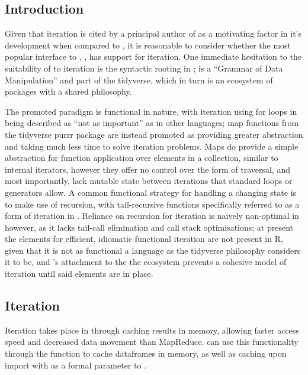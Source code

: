 \subsection{Introduction}\label{subsec:sparklyr-introduction}

Given that iteration is cited by a principal author of  as a
motivating factor in it's development when compared to , it is
reasonable to consider whether the most popular \R{} interface to ,
, has support for iteration\cites{zaharia2010spark,luraschi20}.
One immediate hesitation to the suitability of  to iteration is
the syntactic rooting in ;  is a ``Grammar of Data
Manipulation'' and part of the tidyverse, which in turn is an ecosystem
of packages with a shared philosophy\cite{wickham2019welcome}\cite{wickham2016r}.

The promoted paradigm is functional in nature, with iteration using for
loops in \R{} being described as ``not as important'' as in other
languages; map functions from the tidyverse purrr package are instead
promoted as providing greater abstraction and taking much less time to
solve iteration problems. Maps do provide a simple abstraction for
function application over elements in a collection, similar to internal
iterators, however they offer no control over the form of traversal, and
most importantly, lack mutable state between iterations that standard
loops or generators allow\cite{cousineau1998functional}. A common
functional strategy for handling a changing state is to make use of
recursion, with tail-recursive functions specifically referred to as a
form of iteration in \cite{abelson1996structure}. Reliance on recursion
for iteration is naively non-optimal in \R{} however, as it lacks tail-call
elimination and call stack optimisations\cite{rcore2020lang}; at present
the elements for efficient, idiomatic functional iteration are not
present in R, given that it is not as functional a language as the
tidyverse philosophy considers it to be, and 's attachment to
the the ecosystem prevents a cohesive model of iteration until said
elements are in place.

\subsection{Iteration}\label{iteration}

Iteration takes place in  through caching results in memory,
allowing faster access speed and decreased data movement than
MapReduce\cite{zaharia2010spark}.  can use this functionality
through the  function to
cache  dataframes in memory, as well as caching upon import with
 as a formal parameter to .


